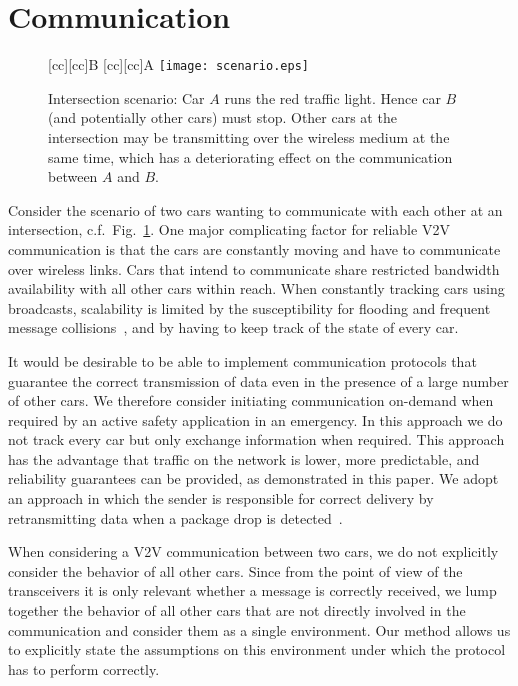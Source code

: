 \documentclass{sig-alternate}
\newcommand{\fig}[1]{Fig.\ \ref{fig:#1}}
\newcommand{\figvspace}{\vspace{-0.2in}}
\begin{document}
\section{Communication} \label{sec:communication}

\begin{figure}
\centering
{}[cc][cc]{\footnotesize{B}}
[cc][cc]{\footnotesize{A}}
	\texttt{[image: scenario.eps]}
\caption{Intersection scenario: Car $A$ runs the red traffic light. Hence car $B$ (and potentially other cars) must stop. Other cars at the intersection may be transmitting over the wireless medium at the same time, which has a deteriorating effect on the communication between $A$ and $B$.}
\label{fig:intersection}
\figvspace
\end{figure}

Consider the scenario of two cars wanting to communicate with each other at an intersection, c.f.\ \fig{intersection}. One major complicating factor for reliable V2V communication is that the cars are constantly moving and have to communicate over wireless links. Cars that intend to communicate share restricted bandwidth availability with all other cars within reach. When constantly tracking cars using broadcasts, scalability is limited by the susceptibility for flooding and frequent message collisions~\cite{routing}, and by having to keep track of the state of every car.

It would be desirable to be able to implement communication protocols that guarantee the correct transmission of data even in the presence of a large number of other cars. We therefore consider initiating communication on-demand when required by an active safety application in an emergency. In this approach we do not track every car but only exchange information when required. This approach has the advantage that traffic on the network is lower, more predictable, and reliability guarantees can be provided, as demonstrated in this paper. We adopt an approach in which the sender is responsible for correct delivery by retransmitting data when a package drop is detected~\cite{initiation}.

When considering a V2V communication between two cars, we do not explicitly consider the behavior of all other cars. Since from the point of view of the transceivers it is only relevant whether a message is correctly received, we lump together the behavior of all other cars that are not directly involved in the communication and consider them as a single environment. Our method allows us to explicitly state the assumptions on this environment under which the protocol has to perform correctly.
\end{document}
